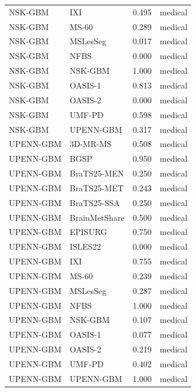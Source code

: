 \begin{tabular}{llrl}
NSK-GBM & IXI & 0.495 & medical \\
NSK-GBM & MS-60 & 0.289 & medical \\
NSK-GBM & MSLesSeg & 0.017 & medical \\
NSK-GBM & NFBS & 0.000 & medical \\
NSK-GBM & NSK-GBM & 1.000 & medical \\
NSK-GBM & OASIS-1 & 0.813 & medical \\
NSK-GBM & OASIS-2 & 0.000 & medical \\
NSK-GBM & UMF-PD & 0.598 & medical \\
NSK-GBM & UPENN-GBM & 0.317 & medical \\
UPENN-GBM & 3D-MR-MS & 0.508 & medical \\
UPENN-GBM & BGSP & 0.950 & medical \\
UPENN-GBM & BraTS25-MEN & 0.250 & medical \\
UPENN-GBM & BraTS25-MET & 0.243 & medical \\
UPENN-GBM & BraTS25-SSA & 0.250 & medical \\
UPENN-GBM & BrainMetShare & 0.500 & medical \\
UPENN-GBM & EPISURG & 0.750 & medical \\
UPENN-GBM & ISLES22 & 0.000 & medical \\
UPENN-GBM & IXI & 0.755 & medical \\
UPENN-GBM & MS-60 & 0.239 & medical \\
UPENN-GBM & MSLesSeg & 0.287 & medical \\
UPENN-GBM & NFBS & 1.000 & medical \\
UPENN-GBM & NSK-GBM & 0.107 & medical \\
UPENN-GBM & OASIS-1 & 0.077 & medical \\
UPENN-GBM & OASIS-2 & 0.219 & medical \\
UPENN-GBM & UMF-PD & 0.402 & medical \\
UPENN-GBM & UPENN-GBM & 1.000 & medical \\
\bottomrule
\end{tabular}
